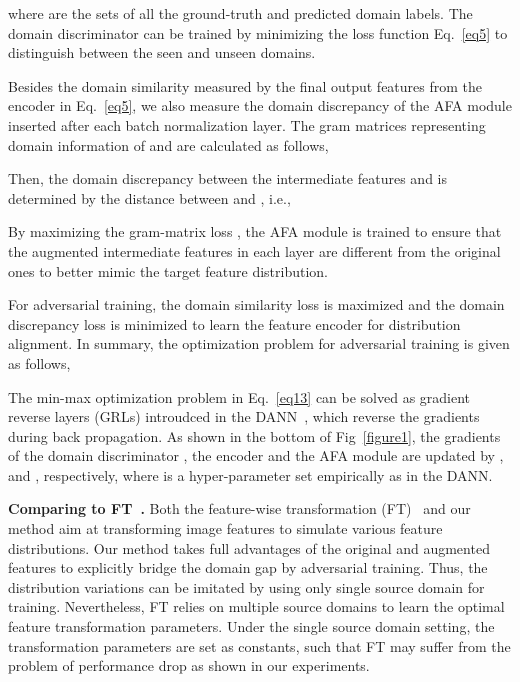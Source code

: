 \documentclass[runningheads]{utils/llncs}
\begin{document}
where  are the sets of all the ground-truth and predicted domain labels.
The domain discriminator can be trained by minimizing the loss function Eq.~\eqref{eq5} to distinguish between the seen and unseen domains.


Besides the domain similarity measured by the final output features from the encoder in Eq.~\eqref{eq5}, 
we also measure the domain discrepancy of the AFA module inserted after each batch normalization layer.
The gram matrices representing domain information of  and  are calculated as follows,


Then, the domain discrepancy between the intermediate features  and  is determined by the distance between  and , i.e.,

By maximizing the gram-matrix loss , the AFA module is trained to ensure that the augmented intermediate features in each layer are different from the original ones to better mimic the target feature distribution.


For adversarial training, the domain similarity loss  is maximized and the domain discrepancy loss  is minimized to learn the feature encoder  for distribution alignment.
In summary, the optimization problem for adversarial training is given as follows,

The min-max optimization problem in Eq.~\eqref{eq13} can be solved as gradient reverse layers (GRLs) introudced in the DANN~\cite{GaninUAGLLML17}, which reverse the gradients during back propagation.
As shown in the bottom of Fig~\ref{figure1}, the gradients of the domain discriminator , the encoder  and the AFA module are updated by ,  and , respectively, where  is a hyper-parameter set empirically as in the DANN. 




\textbf{Comparing to FT~\cite{TsengLH020}.} 
Both the feature-wise transformation (FT)~\cite{TsengLH020} and our method aim at transforming image features to simulate various feature distributions.
Our method takes full advantages of the original and augmented features to explicitly bridge the domain gap by adversarial training.
Thus, the distribution variations can be imitated by using only single source domain for training.
Nevertheless, FT relies on multiple source domains to learn the optimal feature transformation parameters.
Under the single source domain setting, the transformation parameters are set as constants, such that FT may suffer from the problem of performance drop as shown in our experiments.
\end{document}
